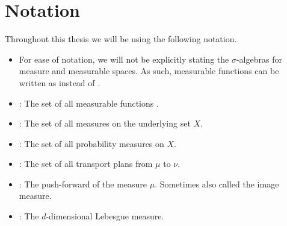 \chapter*{Notation}

Throughout this thesis we will be using the following notation.

\begin{itemize}
	\item For ease of notation, we will not be explicitly stating the $\sigma$-algebras for measure and measurable spaces. As such, measurable functions can be written as  instead of .
	\item {}: The set of all measurable functions .
	\item {}: The set of all measures on the underlying set $X$.
	\item {}: The set of all probability measures on $X$.
	\item \TP{\mu}{\nu}: The set of all transport plans from $\mu$ to $\nu$.
	\item \push{\mu}: The push-forward of the measure $\mu$. Sometimes also called the image measure.
	\item \leb[d]{\cdot}: The $d$-dimensional Lebesgue measure.
\end{itemize}